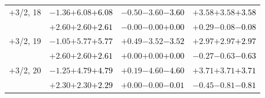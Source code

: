 \documentclass[compress]{beamer}
\begin{document}
\begin{frame}
\begin{tabular}{r | c | c | c}
$+$3/2, 18 & $-1.36$\hspace{0.1 cm}$+6.08$\hspace{0.1 cm}\textcolor{black}{$+6.08$} & $-0.50$\hspace{0.1 cm}$-3.60$\hspace{0.1 cm}\textcolor{black}{$-3.60$} & $+3.58$\hspace{0.1 cm}$+3.58$\hspace{0.1 cm}\textcolor{black}{$+3.58$} \\
           & $+2.60$\hspace{0.1 cm}$+2.60$\hspace{0.1 cm}\textcolor{black}{$+2.61$} & $-0.00$\hspace{0.1 cm}$-0.00$\hspace{0.1 cm}\textcolor{black}{$+0.00$} & $+0.29$\hspace{0.1 cm}$-0.08$\hspace{0.1 cm}\textcolor{black}{$-0.08$} \\
$+$3/2, 19 & $-1.05$\hspace{0.1 cm}$+5.77$\hspace{0.1 cm}\textcolor{black}{$+5.77$} & $+0.49$\hspace{0.1 cm}$-3.52$\hspace{0.1 cm}\textcolor{black}{$-3.52$} & $+2.97$\hspace{0.1 cm}$+2.97$\hspace{0.1 cm}\textcolor{black}{$+2.97$} \\
           & $+2.60$\hspace{0.1 cm}$+2.60$\hspace{0.1 cm}\textcolor{black}{$+2.61$} & $+0.00$\hspace{0.1 cm}$+0.00$\hspace{0.1 cm}\textcolor{black}{$+0.00$} & $-0.27$\hspace{0.1 cm}$-0.63$\hspace{0.1 cm}\textcolor{black}{$-0.63$} \\
$+$3/2, 20 & $-1.25$\hspace{0.1 cm}$+4.79$\hspace{0.1 cm}\textcolor{black}{$+4.79$} & $+0.19$\hspace{0.1 cm}$-4.60$\hspace{0.1 cm}\textcolor{black}{$-4.60$} & $+3.71$\hspace{0.1 cm}$+3.71$\hspace{0.1 cm}\textcolor{black}{$+3.71$} \\
           & $+2.30$\hspace{0.1 cm}$+2.30$\hspace{0.1 cm}\textcolor{black}{$+2.29$} & $+0.00$\hspace{0.1 cm}$-0.00$\hspace{0.1 cm}\textcolor{black}{$-0.01$} & $-0.45$\hspace{0.1 cm}$-0.81$\hspace{0.1 cm}\textcolor{black}{$-0.81$} \\

\end{tabular}
\end{frame}
\end{document}
